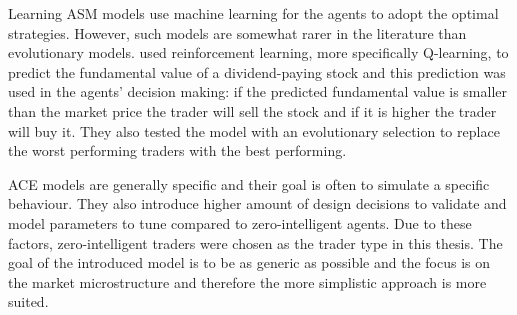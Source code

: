 Learning ASM models use machine learning for the agents to adopt the optimal strategies.
However, such models are somewhat rarer in the literature than evolutionary
models. \citet{Reinforcement09} used reinforcement 
learning, more specifically Q-learning, to predict the fundamental value of a 
dividend-paying stock and this prediction was used in the agents' 
decision making: if the predicted fundamental value is smaller than the market price
the trader will sell the stock and if it is higher the trader will buy it. They 
also tested the model with an evolutionary selection to replace the worst performing
traders with the best performing.



ACE models are generally specific and their goal is often to simulate a specific behaviour.
They also introduce higher amount of design decisions to validate and model parameters 
to tune compared to zero-intelligent agents. Due to these factors, zero-intelligent traders
were chosen as the trader type in this thesis. The goal of the introduced model is to be as 
generic as possible and the focus is on the market microstructure and therefore the more 
simplistic approach is more suited.